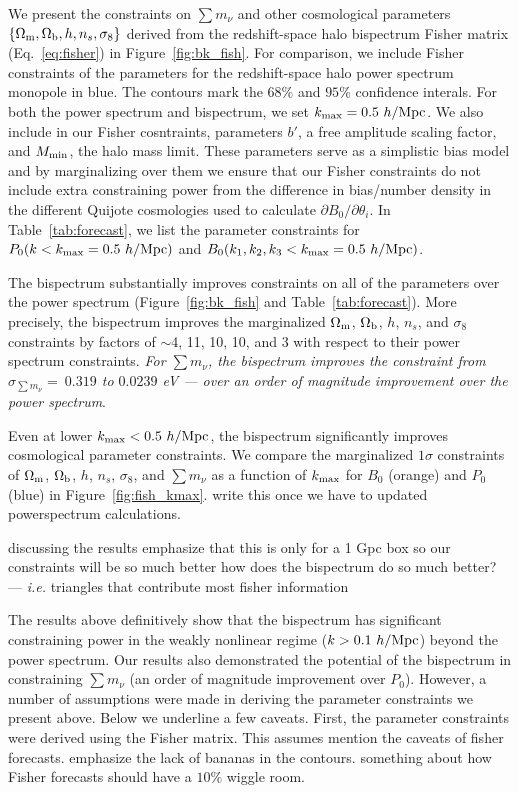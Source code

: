\documentclass[12pt, letterpaper, preprint]{aastex62}
\newcommand{\Om}{\Omega_{\rm m}}
\newcommand{\Ob}{\Omega_{\rm b}}
\newcommand{\smnu}{\sum m_\nu}
\newcommand{\sig}{\sigma_8}
\newcommand{\ch}[1]{{\color{orange}{\bf CH:} #1}}
\begin{document}
We present the constraints on $\smnu$ and other cosmological parameters 
$\{\Om, \Ob, h, n_s, \sig\}$ derived from the redshift-space halo bispectrum 
Fisher matrix (Eq.~\ref{eq:fisher}) in Figure~\ref{fig:bk_fish}. For comparison, 
we include Fisher constraints of the parameters for the redshift-space halo 
power spectrum monopole in blue. The contours mark the $68\%$ and $95\%$ 
confidence interals. For both the power spectrum and bispectrum, we set 
$k_{\rm max} = 0.5~h/{\rm Mpc}$. We also include in our Fisher cosntraints, 
parameters $b'$, a free amplitude scaling factor, and $M_{\rm min}$, the halo 
mass limit. These parameters serve as a simplistic bias model and by marginalizing 
over them we ensure that our Fisher constraints do not include extra constraining 
power from the difference in bias/number density in the different Quijote 
cosmologies used to calculate $\partial B_0/\partial \theta_i$. In Table~\ref{tab:forecast}, 
we list the parameter constraints for $P_0(k < k_{\rm max}=0.5~h/{\rm Mpc})$ and
$B_0(k_1, k_2, k_3 < k_{\rm max}=0.5~h/{\rm Mpc})$.

The bispectrum substantially improves constraints on all of the parameters 
over the power spectrum (Figure~\ref{fig:bk_fish} and Table~\ref{tab:forecast}). 
More precisely, the bispectrum improves the marginalized $\Om$, $\Ob$, $h$, 
$n_s$, and $\sig$ constraints by factors of $\sim$4, 11, 10, 10, and 3 with 
respect to their power spectrum constraints. {\em For $\smnu$, the bispectrum 
improves the constraint from $\sigma_{\smnu}{=}~0.319$ to $0.0239$ eV --- over an order of
magnitude improvement over the power spectrum}.

Even at lower $k_{\rm max} < 0.5~h/{\rm Mpc}$, the bispectrum significantly 
improves cosmological parameter constraints. We compare the marginalized 
$1\sigma$ constraints of $\Om$, $\Ob$, $h$, $n_s$, $\sig$, and $\smnu$ as 
a function of $k_{\rm max}$ for $B_0$ (orange) and $P_0$ (blue) in Figure~\ref{fig:fish_kmax}. 
\ch{write this once we have to updated powerspectrum calculations}. 

discussing the results  
\ch{emphasize that this is only for a 1 Gpc box so our constraints will be so much better} 
\ch{how does the bispectrum do so much better? --- \emph{i.e.} triangles that contribute 
most fisher information} 

The results above definitively show that the bispectrum has significant 
constraining power in the weakly nonlinear regime ($k > 0.1~h/{\rm Mpc}$) 
beyond the power spectrum. Our results also demonstrated the potential of 
the bispectrum in constraining $\smnu$ (an order of magnitude improvement over 
$P_0$). However, a number of assumptions were made in deriving the parameter
constraints we present above. Below we underline a few caveats. First, the 
parameter constraints were derived using the Fisher matrix. This assumes 
\ch{mention the caveats of fisher forecasts}. 
\ch{emphasize the lack of bananas in the contours}. \ch{something about how 
Fisher forecasts should have a $10\%$ wiggle room}. 
\end{document}
